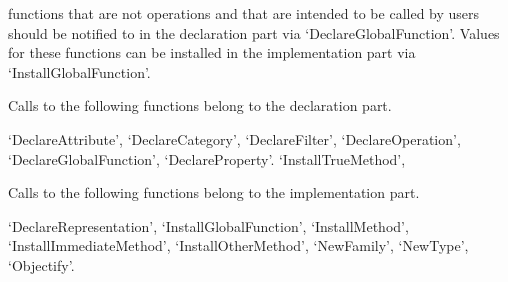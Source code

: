 {\GAP} functions that are not operations and that are intended to be
called by users should be notified to {\GAP} in the declaration part via
`DeclareGlobalFunction'.
Values for these functions can be installed in the implementation part
via `InstallGlobalFunction'.

Calls to the following functions belong to the declaration part.

`DeclareAttribute',
`DeclareCategory',
`DeclareFilter',
`DeclareOperation',
`DeclareGlobalFunction',
`DeclareProperty'.
`InstallTrueMethod',

Calls to the following functions belong to the implementation part.

`DeclareRepresentation',
`InstallGlobalFunction',
`InstallMethod',
`InstallImmediateMethod',
`InstallOtherMethod',
`NewFamily',
`NewType',
`Objectify'.




